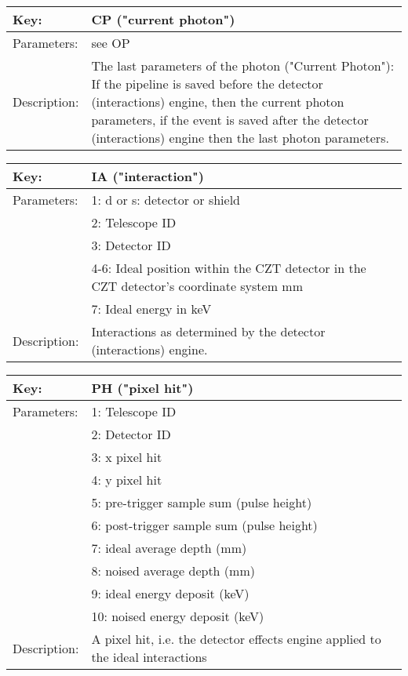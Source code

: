 \begin{table}[htdp]
\begin{center}
\begin{tabular}{|p{2cm}|p{12cm}|}
\hline
Key:&	CP ("current photon")\\
\hline
Parameters:&	see OP\\
\hline
Description:&	The last parameters of the photon ("Current Photon"): If the pipeline
is saved before the detector (interactions) engine, then the current photon
parameters, if the event is saved after the detector (interactions) engine 
then the last photon parameters.\\
\hline
\end{tabular}
\end{center}
\end{table}

\begin{table}[htdp]
\begin{center}
\begin{tabular}{|p{2cm}|p{12cm}|}
\hline
Key:&	IA ("interaction")\\
\hline
Parameters:&	1: d or s: detector or shield\\
&2: Telescope ID\\
&3: Detector ID\\
&4-6: Ideal position within the CZT detector in the CZT detector's coordinate system mm\\
&7: Ideal energy in keV\\
\hline
Description:&	Interactions as determined by the detector (interactions) engine.\\
\hline
\end{tabular}
\end{center}
\end{table}

\begin{table}[htdp]
\begin{center}
\begin{tabular}{|p{2cm}|p{12cm}|}
\hline
Key:&	PH ("pixel hit")\\
\hline
Parameters:&	1: Telescope ID\\
&2: Detector ID\\
&3: x pixel hit\\
&4: y pixel hit\\
&5: pre-trigger sample sum (pulse height)\\
&6: post-trigger sample sum (pulse height)\\
&7: ideal average depth (mm)\\
&8: noised average depth (mm)\\
&9: ideal energy deposit (keV)\\
&10: noised energy deposit (keV)\\
Description:&	A pixel hit, i.e. the detector effects engine applied to the ideal interactions\\
\hline
\end{tabular}
\end{center}
\end{table}

